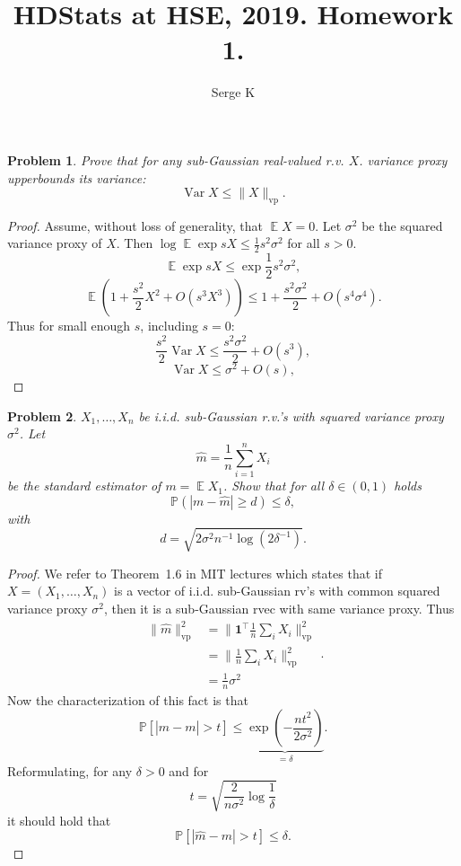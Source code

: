 \documentclass{article}
\title{HDStats at HSE, 2019. Homework 1.}
\author{Serge K}
\newtheorem{problem}{Problem}
\newcommand{\expect}{\operatorname{\mathbb{E}}}
\begin{document}
\maketitle

\begin{problem}
    Prove that
    for any sub-Gaussian real-valued r.v. \( X \).
    variance proxy upperbounds its variance:
    \[
        \operatorname{Var}X \leq \|X\|_{\mathrm{vp}}.
    \]
\end{problem}
\begin{proof}
    Assume, without loss of generality, that \( \expect X = 0\).
    Let \( \sigma^2 \) be the squared variance proxy of \( X \).
    Then \( \log \expect \exp sX \leq \frac12 s^2 \sigma^2 \)
    for all \( s > 0 \).
    \[
        \expect\exp sX \leq \exp \frac12 s^2 \sigma^2,
    \]
    \[
        \expect\left(1 + \frac{s^2}{2} X^2 + O(s^3X^3)\right)
        \leq 1 + \frac{s^2\sigma^2}{2} + O(s^4\sigma^4).
    \]
    Thus for small enough \( s \), including \( s=0 \):
    \[
        \frac{s^2}{2}\operatorname{Var}{X} \leq \frac{s^2\sigma^2}{2} + O(s^3),
    \]
    \[
        \operatorname{Var}{X} \leq \sigma^2 + O(s),
    \]
\end{proof}

\begin{problem}
    \( X_1, \ldots, X_n \) be i.i.d. sub-Gaussian r.v.'s with squared variance proxy \( \sigma^2 \).
    Let
    \[
        \hat{m} = \frac1n \sum_{i=1}^n X_i
    \]
    be the standard estimator of \( m = \expect X_1 \).
    Show that for all \( \delta\in(0,1) \)
    holds
    \[
        \mathbb{P}\left(|m - \hat{m}| \geq d\right) \leq \delta,
    \]
    with
    \[
            d= \sqrt{2\sigma^2 n^{-1} \log(2\delta^{-1})}.
    \]
\end{problem}
\begin{proof}
We refer to \textrm{Theorem~1.6} in MIT lectures
which states that if \( X=(X_1, \ldots, X_n) \)
is a vector of i.i.d. sub-Gaussian rv's with
common squared variance proxy \( \sigma^2 \),
then it is a sub-Gaussian rvec with same variance proxy.
Thus \[\begin{split}
 \|\hat{m}\|_{\textrm{vp}}^2
 & = \|\mathbf{1}^\top \frac1n\sum_i X_i\|_{\textrm{vp}}^2 \\
 & = \|\frac1n\sum_i X_i\|_{\textrm{vp}}^2 \\
 & = \frac1n \sigma^2 \end{split}.\]
Now the characterization of this fact is that
\[
\mathbb{P}\left[|\hat{m} - m| > t\right]
\leq \underbrace{\exp(-\frac{nt^2}{2\sigma^2})}_{=\delta}.
\]
Reformulating, for any \( \delta > 0 \) and for
\[ t = \sqrt{
\frac{2}{n\sigma^2}\log\frac{1}{\delta}
} \]
it should hold that
\[ \mathbb{P}[|\hat{m} - m| > t] \leq \delta. \]
\end{proof}
\end{document}
